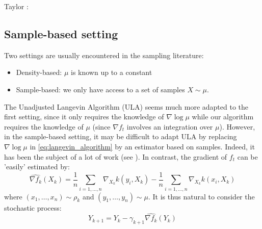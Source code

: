 Taylor : 


\subsection{Sample-based setting}

Two settings are usually encountered in the sampling literature:
\begin{itemize}
	\item Density-based: $\mu$ is known up to a constant
	\item Sample-based: we only have access to a set of samples $X \sim \mu$.
\end{itemize}

The Unadjusted Langevin Algorithm (ULA) seems much more adapted to the first setting, since it only requires the knowledge of $\nabla \log \mu$ while our algorithm requires the knowledge of $\mu$ (since $\nabla f_t$ involves an integration over $\mu$). However, in the sample-based setting, it may be difficult to adapt ULA by replacing $\nabla \log \mu$ in \eqref{eq:langevin_algorithm} by an estimator based on samples. Indeed, it has been the subject of a lot of work (see \cite{li2017gradient}). In contrast, the gradient of $f_t$ can be 'easily' estimated by:
\begin{equation}
\widehat{\nabla f_k}(X_k)= \frac{1}{n}\sum_{i=1,\dots,n}\nabla_{X_k}k(y_i,X_k) -\frac{1}{n}\sum_{i=1,\dots,n}\nabla_{X_k}k(x_i,X_k) 
\end{equation}
where $(x_1, \dots, x_n)\sim \rho_k$ and $(y_1, \dots, y_n)\sim \mu$. 
It is thus natural to consider the stochastic process:
\begin{equation}\label{eq:sample_based_stochastic_process}
Y_{k+1}=Y_k-\gamma_{k+1}\widehat{\nabla f_k}(Y_k) 
\end{equation}


